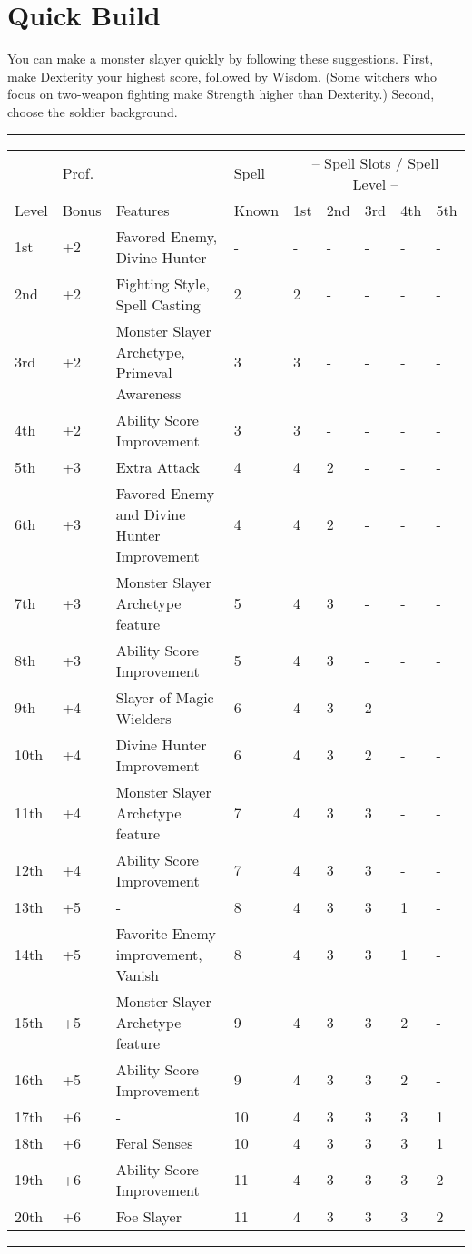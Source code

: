 \documentclass[11pt,a4paper,twocolumn, sans]{article}
\begin{document}
	\section*{Quick Build}
	You can make a monster slayer quickly by following these suggestions. First, make Dexterity your highest score, followed by Wisdom. (Some witchers who focus on two-weapon fighting make Strength higher than Dexterity.) Second, choose the soldier background.
	
	\begin{table*}
		\small
		\hrule
		\begin{tabularx}{\textwidth}{|l p{30pt} p{180pt} p{30pt} X X X X X|}
			\hiderowcolors
			 & Prof. & & Spell & \multicolumn{5}{c|}{-- Spell Slots / Spell Level --} \\
			Level & Bonus & Features & Known & 1st & 2nd & 3rd & 4th & 5th \\
			
			\showrowcolors
			1st & +2 & Favored Enemy, Divine Hunter & - & - & - & - & - &- \\
			2nd & +2 & Fighting Style, Spell Casting & 2 & 2 & - & - &- &- \\
			3rd & +2 & Monster Slayer Archetype, Primeval Awareness & 3 & 3 & - & - &- &- \\
			4th & +2 & Ability Score Improvement & 3 & 3 & - & - &- &- \\
			5th & +3 & Extra Attack & 4 & 4 & 2 & - & - & - \\
			6th & +3 & Favored Enemy and Divine Hunter Improvement & 4 & 4 & 2 & - & - & - \\
			7th & +3 & Monster Slayer Archetype feature & 5 & 4 & 3  & - & - & - \\
			8th & +3 & Ability Score Improvement & 5 & 4 & 3  & - & - & - \\
			9th & +4 & Slayer of Magic Wielders & 6 & 4 & 3 & 2 & - & - \\
			10th & +4 & Divine Hunter Improvement & 6 & 4 & 3 & 2 & - & - \\
			11th & +4 & Monster Slayer Archetype feature & 7 & 4 & 3  & 3 & - & - \\
			12th & +4 & Ability Score Improvement & 7 & 4 & 3  & 3 & - & - \\
			13th & +5 & - & 8 & 4 & 3 & 3 & 1 & - \\
			14th & +5 & Favorite Enemy improvement, Vanish & 8 & 4 & 3 & 3 & 1 & - \\
			15th & +5 & Monster Slayer Archetype feature & 9 & 4 & 3 & 3 & 2 & - \\
			16th & +5 & Ability Score Improvement & 9 & 4 & 3 & 3 & 2 & - \\
			17th & +6 & - & 10 & 4 & 3 & 3 & 3 & 1 \\
			18th & +6 & Feral Senses & 10 & 4 & 3 & 3 & 3 & 1 \\
			19th & +6 & Ability Score Improvement & 11 & 4 & 3 & 3 & 3 & 2 \\
			20th & +6 & Foe Slayer & 11 & 4 & 3 & 3 & 3 & 2 \\
		\end{tabularx}
		\hrule
	\end{table*}
\end{document}
